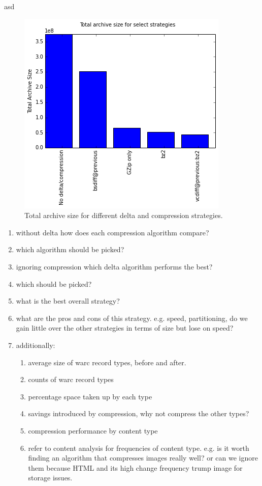\documentclass[11pt]{article}
\begin{document}
asd

\begin{figure}
  \centering
  \includegraphics[width=\linewidth]{images/tas_best.png}
  \caption{Total archive size for different delta and compression strategies.}
  \label{fig:tas_best}
\end{figure}

\begin{enumerate}
\item without delta how does each compression algorithm compare?
\item which algorithm should be picked?
\item ignoring compression which delta algorithm performs the best?
\item which should be picked?
\item what is the best overall strategy?
\item what are the pros and cons of this strategy. e.g. speed, partitioning, do we gain little over the other strategies in terms of size but lose on speed?
\item additionally:
\begin{enumerate}
\item average size of warc record types, before and after.
\item counts of warc record types
\item percentage space taken up by each type
\item savings introduced by compression, why not compress the other types?
\item compression performance by content type
\item refer to content analysis for frequencies of content type. e.g. is it worth finding an algorithm that compresses images really well? or can we ignore them because HTML and its high change frequency trump image for storage issues.
\end{enumerate}
\end{enumerate}
\end{document}
